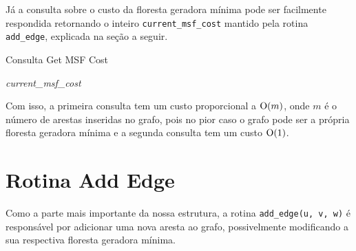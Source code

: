 Já a consulta sobre o custo da floresta geradora mínima pode ser facilmente respondida retornando o inteiro \texttt{current\_msf\_cost} mantido pela rotina \texttt{add\_edge}, explicada na seção a seguir.

\begin{algorithm}[h!]
    \caption{Consulta Get MSF Cost}\label{imsf-get-msf-cost}
    \begin{algorithmic}
        \State \Return \emph{current\_msf\_cost}
        \EndFunction
    \end{algorithmic}
\end{algorithm}

Com isso, a primeira consulta tem um custo proporcional a $\mathrm{O}(m)$, onde $m$ é o número de arestas inseridas no grafo, pois no pior caso o grafo pode ser a própria floresta geradora mínima e a segunda consulta tem um custo $\mathrm{O}(1)$.

\section{Rotina Add Edge}
\label{sec:imsf-add-edge}

Como a parte mais importante da nossa estrutura, a rotina \texttt{add\_edge(u, v, w)} é responsável por adicionar uma nova aresta ao grafo, possivelmente modificando a sua respectiva floresta geradora mínima.








